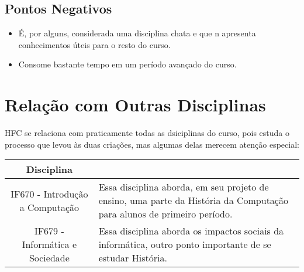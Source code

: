 \documentclass{article}
\begin{document}
\subsection{Pontos Negativos}

\begin{itemize}
    \item É, por alguns, considerada uma disciplina chata e que n apresenta conhecimentos úteis para o resto do curso.
    \item Consome bastante tempo em um período avançado do curso.
    
\end{itemize}

\pagebreak

\section{Relação com Outras Disciplinas}

HFC se relaciona com praticamente todas as dsiciplinas do curso, pois estuda o processo que levou às duas criações, mas algumas delas merecem atenção especial:

\begin{table}[h]
    \centering
    \begin{tabular}{||c|m{9cm}||}
    \hline
     Disciplina & \\
     \hline
     IF670 - Introdução a Computação & Essa disciplina aborda, em seu projeto de ensino, uma parte da História da Computação para alunos de primeiro período. \cite{cinwikiif668}\\
     \hline
     IF679 - Informática e Sociedade & Essa disciplina aborda os impactos sociais da informática, outro ponto importante de se estudar História. \cite{cinwikiif679}\\
     \hline
     
     
        
    \end{tabular}
    
    
    \label{tab:relacoes}
\end{table}



\nocite{*}
\end{document}
